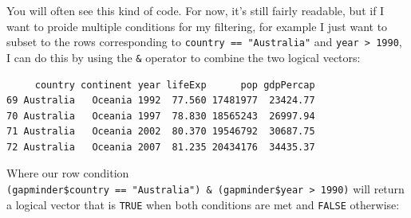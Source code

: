 \documentclass[
  letterpaper,
  DIV=11,
  numbers=noendperiod]{scrreprt}
\newenvironment{Shaded}{\begin{snugshade}}{\end{snugshade}}
\newcommand{\DecValTok}[1]{\textcolor[rgb]{0.68,0.00,0.00}{#1}}
\newcommand{\NormalTok}[1]{\textcolor[rgb]{0.00,0.23,0.31}{#1}}
\newcommand{\SpecialCharTok}[1]{\textcolor[rgb]{0.37,0.37,0.37}{#1}}
\newcommand{\StringTok}[1]{\textcolor[rgb]{0.13,0.47,0.30}{#1}}
\begin{document}
You will often see this kind of code. For now, it's still fairly
readable, but if I want to proide multiple conditions for my filtering,
for example I just want to subset to the rows corresponding to
\texttt{country\ ==\ "Australia"} and
\texttt{year\ \textgreater{}\ 1990}, I can do this by using the
\texttt{\&} operator to combine the two logical vectors:

\begin{Shaded}
\end{Shaded}

\begin{verbatim}
     country continent year lifeExp      pop gdpPercap
69 Australia   Oceania 1992  77.560 17481977  23424.77
70 Australia   Oceania 1997  78.830 18565243  26997.94
71 Australia   Oceania 2002  80.370 19546792  30687.75
72 Australia   Oceania 2007  81.235 20434176  34435.37
\end{verbatim}

Where our row condition
\texttt{(gapminder\$country\ ==\ "Australia")\ \&\ (gapminder\$year\ \textgreater{}\ 1990)}
will return a logical vector that is \texttt{TRUE} when both conditions
are met and \texttt{FALSE} otherwise:

\begin{Shaded}
\end{Shaded}
\end{document}

